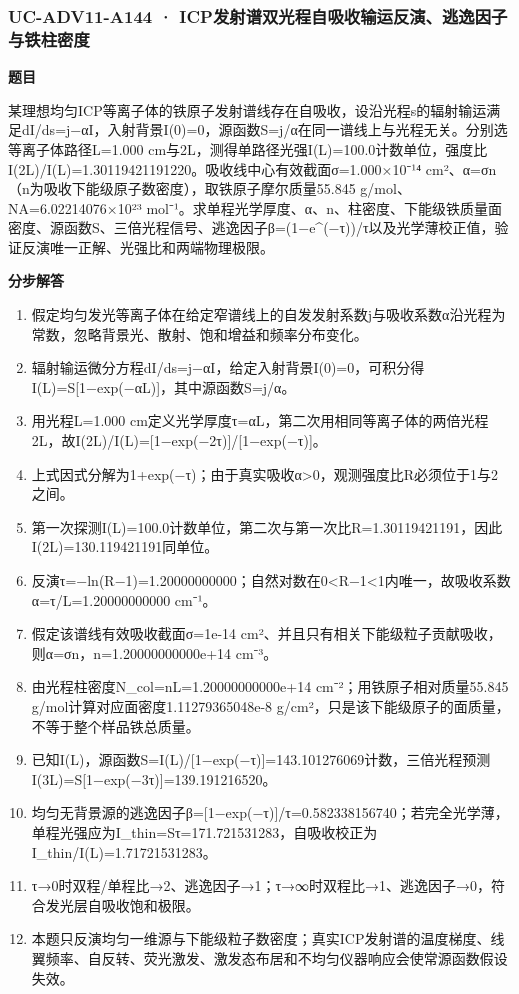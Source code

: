 \documentclass[UTF8,11pt,a4paper]{ctexart}
\begin{document}
\subsubsection*{UC-ADV11-A144 · ICP发射谱双光程自吸收输运反演、逃逸因子与铁柱密度}
\noindent\textbf{题目}\par
某理想均匀ICP等离子体的铁原子发射谱线存在自吸收，设沿光程s的辐射输运满足dI/ds=j−αI，入射背景I(0)=0，源函数S=j/α在同一谱线上与光程无关。分别选等离子体路径L=1.000 cm与2L，测得单路径光强I(L)=100.0计数单位，强度比I(2L)/I(L)=1.30119421191220。吸收线中心有效截面σ=1.000×10⁻¹⁴ cm²、α=σn（n为吸收下能级原子数密度），取铁原子摩尔质量55.845 g/mol、NA=6.02214076×10²³ mol⁻¹。求单程光学厚度、α、n、柱密度、下能级铁质量面密度、源函数S、三倍光程信号、逃逸因子β=(1−e\textasciicircum{}(−τ))/τ以及光学薄校正值，验证反演唯一正解、光强比和两端物理极限。\par
\medskip\noindent\textbf{分步解答}
\begin{enumerate}
\item 假定均匀发光等离子体在给定窄谱线上的自发发射系数j与吸收系数α沿光程为常数，忽略背景光、散射、饱和增益和频率分布变化。
\item 辐射输运微分方程dI/ds=j−αI，给定入射背景I(0)=0，可积分得I(L)=S[1−exp(−αL)]，其中源函数S=j/α。
\item 用光程L=1.000 cm定义光学厚度τ=αL，第二次用相同等离子体的两倍光程2L，故I(2L)/I(L)=[1−exp(−2τ)]/[1−exp(−τ)]。
\item 上式因式分解为1+exp(−τ)；由于真实吸收α>0，观测强度比R必须位于1与2之间。
\item 第一次探测I(L)=100.0计数单位，第二次与第一次比R=1.30119421191，因此I(2L)=130.119421191同单位。
\item 反演τ=−ln(R−1)=1.20000000000；自然对数在0<R−1<1内唯一，故吸收系数α=τ/L=1.20000000000 cm⁻¹。
\item 假定该谱线有效吸收截面σ=1e-14 cm²、并且只有相关下能级粒子贡献吸收，则α=σn，n=1.20000000000e+14 cm⁻³。
\item 由光程柱密度N\_col=nL=1.20000000000e+14 cm⁻²；用铁原子相对质量55.845 g/mol计算对应面密度1.11279365048e-8 g/cm²，只是该下能级原子的面质量，不等于整个样品铁总质量。
\item 已知I(L)，源函数S=I(L)/[1−exp(−τ)]=143.101276069计数，三倍光程预测I(3L)=S[1−exp(−3τ)]=139.191216520。
\item 均匀无背景源的逃逸因子β=[1−exp(−τ)]/τ=0.582338156740；若完全光学薄，单程光强应为I\_thin=Sτ=171.721531283，自吸收校正为I\_thin/I(L)=1.71721531283。
\item τ→0时双程/单程比→2、逃逸因子→1；τ→∞时双程比→1、逃逸因子→0，符合发光层自吸收饱和极限。
\item 本题只反演均匀一维源与下能级粒子数密度；真实ICP发射谱的温度梯度、线翼频率、自反转、荧光激发、激发态布居和不均匀仪器响应会使常源函数假设失效。
\end{enumerate}
\end{document}
